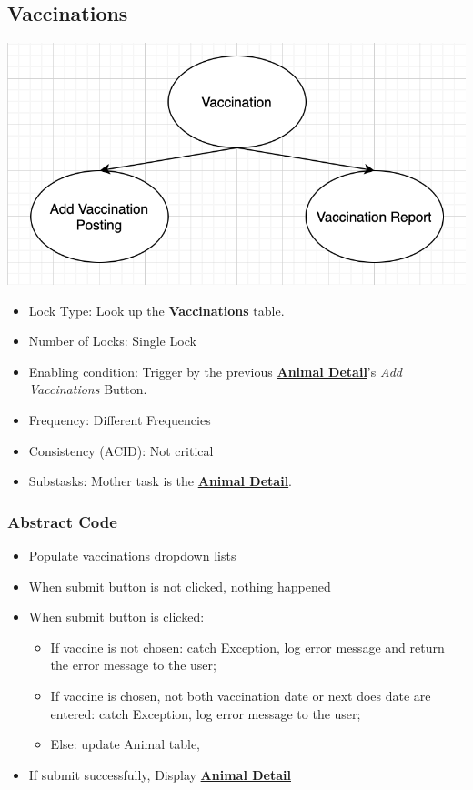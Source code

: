 \documentclass[a4paper]{article}
\begin{document}
\hypertarget{vaccinations}{\subsection{Vaccinations}}
\includegraphics[scale = 0.6]{vaccination.png}

\begin{itemize}
	\item Lock Type: Look up the \textbf{Vaccinations} table.
	\item Number of Locks: Single Lock
	\item Enabling condition: Trigger by the previous \underline{\textbf{Animal Detail}}'s \textit{Add Vaccinations} Button.
	\item Frequency: Different Frequencies
	\item Consistency (ACID): Not critical
	\item Substasks: Mother task is the \underline{\textbf{Animal Detail}}.
\end{itemize}

\subsubsection*{Abstract Code}

\begin{itemize}
	\item Populate vaccinations dropdown lists
	\item When submit button is not clicked, nothing happened
	\item When submit button is clicked:
	\begin{itemize}
	    \item If vaccine is not chosen: catch Exception, log error message and return the error message to the user;
	    \item If vaccine is chosen, not both vaccination date or next does date are entered: catch Exception, log error message to the user;
	    \item  Else: update Animal table,
	 \end{itemize}
	 \item If submit successfully, Display \underline{\textbf{Animal Detail}}
\end{itemize}
\end{document}
